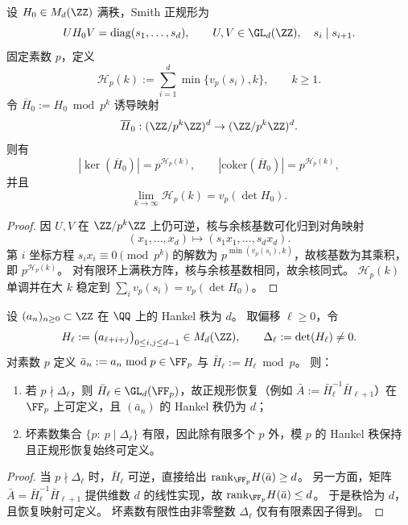\begin{theorem}\label{thm:xi-time-part9e-smith-kernel-cokernel-count}
设 \(H_0\in M_d(\ZZ)\) 满秩，Smith 正规形为
\[
U H_0 V=\mathrm{diag}(s_1,\dots,s_d),
\qquad
U,V\in\GL_d(\ZZ),\quad s_i\mid s_{i+1}.
\]
固定素数 \(p\)，定义
\[
\mathcal H_p(k):=\sum_{i=1}^{d}\min\{v_p(s_i),k\},\qquad k\ge 1.
\]
令 \(\overline H_0:=H_0\bmod p^k\) 诱导映射
\[
\overline H_0:(\ZZ/p^k\ZZ)^d\to(\ZZ/p^k\ZZ)^d.
\]
则有
\[
|\ker(\overline H_0)|=p^{\mathcal H_p(k)},
\qquad
|\mathrm{coker}(\overline H_0)|=p^{\mathcal H_p(k)},
\]
并且
\[
\lim_{k\to\infty}\mathcal H_p(k)=v_p(\det H_0).
\]
\end{theorem}
\begin{proof}
因 \(U,V\) 在 \(\ZZ/p^k\ZZ\) 上仍可逆，核与余核基数可化归到对角映射
\[
(x_1,\dots,x_d)\mapsto(s_1x_1,\dots,s_dx_d).
\]
第 \(i\) 坐标方程 \(s_ix_i\equiv 0\pmod{p^k}\) 的解数为 \(p^{\min(v_p(s_i),k)}\)，故核基数为其乘积，即 \(p^{\mathcal H_p(k)}\)。
对有限环上满秩方阵，核与余核基数相同，故余核同式。
\(\mathcal H_p(k)\) 单调并在大 \(k\) 稳定到 \(\sum_i v_p(s_i)=v_p(\det H_0)\)。
\end{proof}

\begin{theorem}\label{thm:xi-time-part9e-hankel-modp-rank-preservation}
设 \((a_n)_{n\ge 0}\subset\ZZ\) 在 \(\QQ\) 上的 Hankel 秩为 \(d\)。
取偏移 \(\ell\ge 0\)，令
\[
H_\ell:=\bigl(a_{\ell+i+j}\bigr)_{0\le i,j\le d-1}\in M_d(\ZZ),
\qquad
\Delta_\ell:=\det(H_\ell)\neq 0.
\]
对素数 \(p\) 定义 \(\bar a_n:=a_n\bmod p\in\FF_p\) 与 \(\bar H_\ell:=H_\ell\bmod p\)。
则：
\begin{enumerate}
  \item 若 \(p\nmid \Delta_\ell\)，则 \(\bar H_\ell\in\GL_d(\FF_p)\)，故正规形恢复（例如 \(\bar A:=\bar H_\ell^{-1}\bar H_{\ell+1}\)）在 \(\FF_p\) 上可定义，且 \((\bar a_n)\) 的 Hankel 秩仍为 \(d\)；
  \item 坏素数集合 \(\{p:\ p\mid \Delta_\ell\}\) 有限，因此除有限多个 \(p\) 外，模 \(p\) 的 Hankel 秩保持且正规形恢复始终可定义。
\end{enumerate}
\end{theorem}
\begin{proof}
当 \(p\nmid\Delta_\ell\) 时，\(\bar H_\ell\) 可逆，直接给出 \(\mathrm{rank}_{\FF_p}H(\bar a)\ge d\)。
另一方面，矩阵 \(\bar A=\bar H_\ell^{-1}\bar H_{\ell+1}\) 提供维数 \(d\) 的线性实现，故 \(\mathrm{rank}_{\FF_p}H(\bar a)\le d\)。
于是秩恰为 \(d\)，且恢复映射可定义。
坏素数有限性由非零整数 \(\Delta_\ell\) 仅有有限素因子得到。
\end{proof}

